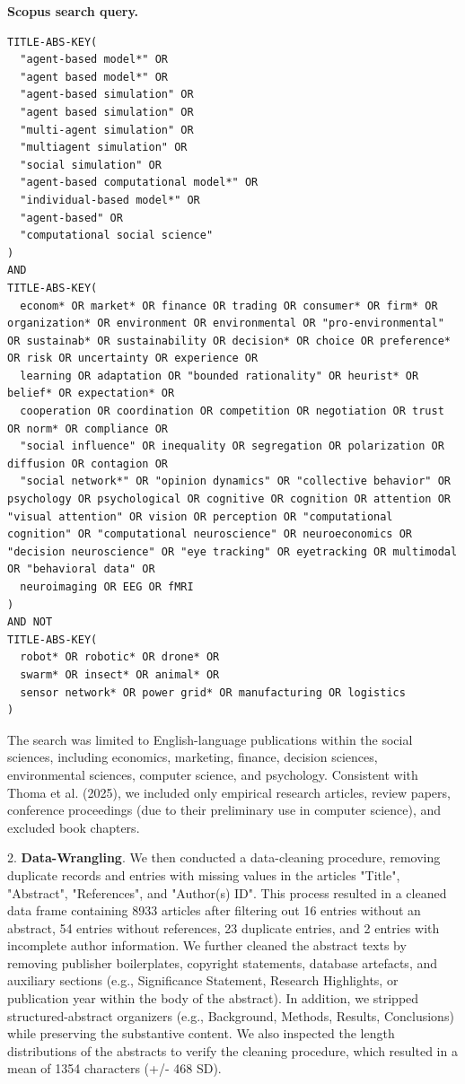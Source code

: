 \documentclass[pdflatex,sn-mathphys-num]{sn-jnl}%
\theoremstyle{thmstyleone}%
\theoremstyle{thmstyletwo}%
\theoremstyle{thmstylethree}%
\begin{document}
\noindent\textbf{Scopus search query.}
\begin{lstlisting}
TITLE-ABS-KEY(
  "agent-based model*" OR
  "agent based model*" OR
  "agent-based simulation" OR
  "agent based simulation" OR
  "multi-agent simulation" OR
  "multiagent simulation" OR
  "social simulation" OR
  "agent-based computational model*" OR
  "individual-based model*" OR
  "agent-based" OR
  "computational social science"
)
AND
TITLE-ABS-KEY(
  econom* OR market* OR finance OR trading OR consumer* OR firm* OR organization* OR environment OR environmental OR "pro-environmental" OR sustainab* OR sustainability OR decision* OR choice OR preference* OR risk OR uncertainty OR experience OR
  learning OR adaptation OR "bounded rationality" OR heurist* OR belief* OR expectation* OR
  cooperation OR coordination OR competition OR negotiation OR trust OR norm* OR compliance OR
  "social influence" OR inequality OR segregation OR polarization OR diffusion OR contagion OR
  "social network*" OR "opinion dynamics" OR "collective behavior" OR psychology OR psychological OR cognitive OR cognition OR attention OR "visual attention" OR vision OR perception OR "computational cognition" OR "computational neuroscience" OR neuroeconomics OR "decision neuroscience" OR "eye tracking" OR eyetracking OR multimodal OR "behavioral data" OR
  neuroimaging OR EEG OR fMRI
)
AND NOT
TITLE-ABS-KEY(
  robot* OR robotic* OR drone* OR
  swarm* OR insect* OR animal* OR
  sensor network* OR power grid* OR manufacturing OR logistics
)
\end{lstlisting}

\vspace{0.70em}

The search was limited to English-language publications within the social sciences, including economics, marketing, finance, decision sciences, environmental sciences, computer science, and psychology. Consistent with Thoma et al. (2025), we included only empirical research articles, review papers, conference proceedings (due to their preliminary use in computer science), and excluded book chapters.

\vspace{1em}

{\Large 2.} \textbf{Data-Wrangling}.
We then conducted a data-cleaning procedure, removing duplicate records and entries with missing values in the articles "Title", "Abstract", "References", and "Author(s) ID". This process resulted in a cleaned data frame containing 8933 articles after filtering out 16 entries without an abstract, 54 entries without references, 23 duplicate entries, and 2 entries with incomplete author information.
We further cleaned the abstract texts by removing publisher boilerplates, copyright statements, database artefacts, and auxiliary sections (e.g., Significance Statement, Research Highlights, or publication year within the body of the abstract). In addition, we stripped structured-abstract organizers (e.g., Background, Methods, Results, Conclusions) while preserving the substantive content. We also inspected the length distributions of the abstracts to verify the cleaning procedure, which resulted in a mean of 1354 characters (+/- 468 SD).
\end{document}
